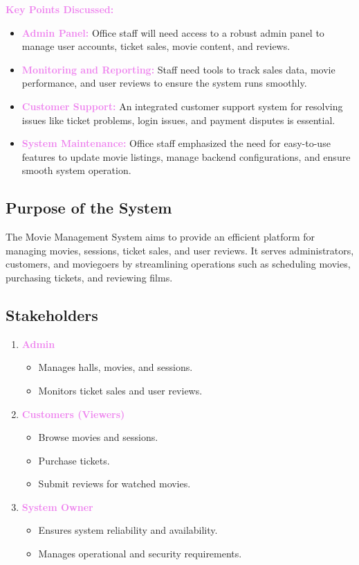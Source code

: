 \documentclass[a4paper,12pt]{article}  %
\renewcommand{\textbf}[1]{\textcolor{violet}{\bfseries #1}}
\begin{document}
\textbf{Key Points Discussed:}
\begin{itemize}
    \item \textbf{Admin Panel:} Office staff will need access to a robust admin panel to manage user accounts, ticket sales, movie content, and reviews.
    \item \textbf{Monitoring and Reporting:} Staff need tools to track sales data, movie performance, and user reviews to ensure the system runs smoothly.
    \item \textbf{Customer Support:} An integrated customer support system for resolving issues like ticket problems, login issues, and payment disputes is essential.
    \item \textbf{System Maintenance:} Office staff emphasized the need for easy-to-use features to update movie listings, manage backend configurations, and ensure smooth system operation.
\end{itemize}


\subsection{Purpose of the System}

The Movie Management System aims to provide an efficient platform for managing movies, sessions, ticket sales, and user reviews. It serves administrators, customers, and moviegoers by streamlining operations such as scheduling movies, purchasing tickets, and reviewing films.

\subsection{Stakeholders}

\begin{enumerate}
    \item \textbf{Admin}
    \begin{itemize}
        \item Manages halls, movies, and sessions.
        \item Monitors ticket sales and user reviews.
    \end{itemize}
    
    \item \textbf{Customers (Viewers)}
    \begin{itemize}
        \item Browse movies and sessions.
        \item Purchase tickets.
        \item Submit reviews for watched movies.
    \end{itemize}
    
    \item \textbf{System Owner}
    \begin{itemize}
        \item Ensures system reliability and availability.
        \item Manages operational and security requirements.
    \end{itemize}
\end{enumerate}
\end{document}
